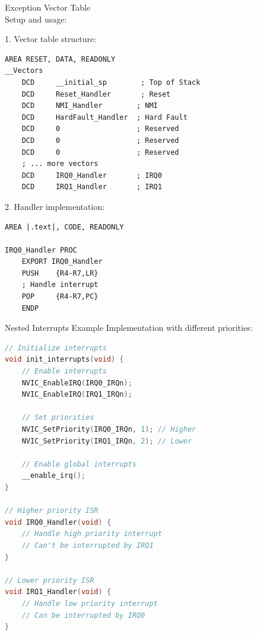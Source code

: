 \begin{KR}{Exception Vector Table}\\
Setup and usage:

1. Vector table structure:
\begin{lstlisting}[language=armasm, style=basesmol]
    AREA RESET, DATA, READONLY
__Vectors
    DCD     __initial_sp        ; Top of Stack
    DCD     Reset_Handler       ; Reset
    DCD     NMI_Handler        ; NMI
    DCD     HardFault_Handler  ; Hard Fault
    DCD     0                  ; Reserved
    DCD     0                  ; Reserved
    DCD     0                  ; Reserved
    ; ... more vectors
    DCD     IRQ0_Handler       ; IRQ0
    DCD     IRQ1_Handler       ; IRQ1
\end{lstlisting}

2. Handler implementation:
\begin{lstlisting}[language=armasm, style=basesmol]
    AREA |.text|, CODE, READONLY
    
IRQ0_Handler PROC
    EXPORT IRQ0_Handler
    PUSH    {R4-R7,LR}
    ; Handle interrupt
    POP     {R4-R7,PC}
    ENDP
\end{lstlisting}
\end{KR}

\begin{example2}{Nested Interrupts Example}
Implementation with different priorities:
\begin{lstlisting}[language=C, style=basesmol]
// Initialize interrupts
void init_interrupts(void) {
    // Enable interrupts
    NVIC_EnableIRQ(IRQ0_IRQn);
    NVIC_EnableIRQ(IRQ1_IRQn);
    
    // Set priorities
    NVIC_SetPriority(IRQ0_IRQn, 1); // Higher
    NVIC_SetPriority(IRQ1_IRQn, 2); // Lower
    
    // Enable global interrupts
    __enable_irq();
}

// Higher priority ISR
void IRQ0_Handler(void) {
    // Handle high priority interrupt
    // Can't be interrupted by IRQ1
}

// Lower priority ISR
void IRQ1_Handler(void) {
    // Handle low priority interrupt
    // Can be interrupted by IRQ0
}
\end{lstlisting}
\end{example2}

